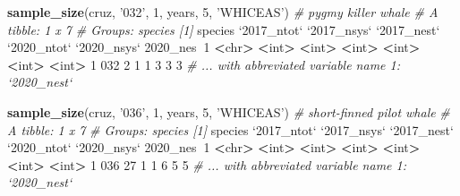 \documentclass[
]{book}
\newenvironment{Shaded}{\begin{snugshade}}{\end{snugshade}}
\newcommand{\CommentTok}[1]{\textcolor[rgb]{0.56,0.35,0.01}{\textit{#1}}}
\newcommand{\DataTypeTok}[1]{\textcolor[rgb]{0.13,0.29,0.53}{#1}}
\newcommand{\DecValTok}[1]{\textcolor[rgb]{0.00,0.00,0.81}{#1}}
\newcommand{\ErrorTok}[1]{\textcolor[rgb]{0.64,0.00,0.00}{\textbf{#1}}}
\newcommand{\KeywordTok}[1]{\textcolor[rgb]{0.13,0.29,0.53}{\textbf{#1}}}
\newcommand{\NormalTok}[1]{#1}
\newcommand{\OperatorTok}[1]{\textcolor[rgb]{0.81,0.36,0.00}{\textbf{#1}}}
\newcommand{\StringTok}[1]{\textcolor[rgb]{0.31,0.60,0.02}{#1}}
\begin{document}
\begin{Shaded}
\begin{Highlighting}[]
\KeywordTok{sample_size}\NormalTok{(cruz, }\StringTok{'032'}\NormalTok{, }\DecValTok{1}\NormalTok{, years, }\DecValTok{5}\NormalTok{, }\StringTok{'WHICEAS'}\NormalTok{) }\CommentTok{# pygmy killer whale}
\CommentTok{# A tibble: 1 x 7}
\CommentTok{# Groups:   species [1]}
\NormalTok{  species }\StringTok{`}\DataTypeTok{2017_ntot}\StringTok{`} \StringTok{`}\DataTypeTok{2017_nsys}\StringTok{`} \StringTok{`}\DataTypeTok{2017_nest}\StringTok{`} \StringTok{`}\DataTypeTok{2020_ntot}\StringTok{`} \StringTok{`}\DataTypeTok{2020_nsys}\StringTok{`} \DecValTok{2020}\NormalTok{_nes}\OperatorTok{~}\DecValTok{1}
  \OperatorTok{<}\NormalTok{chr}\OperatorTok{>}\StringTok{         }\ErrorTok{<}\NormalTok{int}\OperatorTok{>}\StringTok{       }\ErrorTok{<}\NormalTok{int}\OperatorTok{>}\StringTok{       }\ErrorTok{<}\NormalTok{int}\OperatorTok{>}\StringTok{       }\ErrorTok{<}\NormalTok{int}\OperatorTok{>}\StringTok{       }\ErrorTok{<}\NormalTok{int}\OperatorTok{>}\StringTok{      }\ErrorTok{<}\NormalTok{int}\OperatorTok{>}
\DecValTok{1} \DecValTok{032}               \DecValTok{2}           \DecValTok{1}           \DecValTok{1}           \DecValTok{3}           \DecValTok{3}          \DecValTok{3}
\CommentTok{# ... with abbreviated variable name 1: `2020_nest`}

\KeywordTok{sample_size}\NormalTok{(cruz, }\StringTok{'036'}\NormalTok{, }\DecValTok{1}\NormalTok{, years, }\DecValTok{5}\NormalTok{, }\StringTok{'WHICEAS'}\NormalTok{) }\CommentTok{# short-finned pilot whale}
\CommentTok{# A tibble: 1 x 7}
\CommentTok{# Groups:   species [1]}
\NormalTok{  species }\StringTok{`}\DataTypeTok{2017_ntot}\StringTok{`} \StringTok{`}\DataTypeTok{2017_nsys}\StringTok{`} \StringTok{`}\DataTypeTok{2017_nest}\StringTok{`} \StringTok{`}\DataTypeTok{2020_ntot}\StringTok{`} \StringTok{`}\DataTypeTok{2020_nsys}\StringTok{`} \DecValTok{2020}\NormalTok{_nes}\OperatorTok{~}\DecValTok{1}
  \OperatorTok{<}\NormalTok{chr}\OperatorTok{>}\StringTok{         }\ErrorTok{<}\NormalTok{int}\OperatorTok{>}\StringTok{       }\ErrorTok{<}\NormalTok{int}\OperatorTok{>}\StringTok{       }\ErrorTok{<}\NormalTok{int}\OperatorTok{>}\StringTok{       }\ErrorTok{<}\NormalTok{int}\OperatorTok{>}\StringTok{       }\ErrorTok{<}\NormalTok{int}\OperatorTok{>}\StringTok{      }\ErrorTok{<}\NormalTok{int}\OperatorTok{>}
\DecValTok{1} \DecValTok{036}              \DecValTok{27}           \DecValTok{1}           \DecValTok{1}           \DecValTok{6}           \DecValTok{5}          \DecValTok{5}
\CommentTok{# ... with abbreviated variable name 1: `2020_nest`}


\end{Highlighting}
\end{Shaded}
\end{document}
